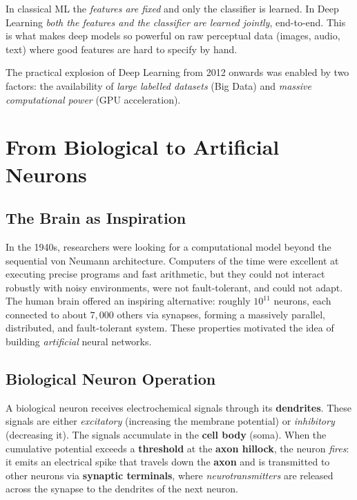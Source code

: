 \documentclass[11pt,a4paper]{article}
\newcommand{\term}[1]{\textcolor{DefGreen}{\textbf{#1}}}
\begin{document}
\begin{insightbox}
In classical ML the \emph{features are fixed} and only the classifier is learned. In Deep Learning \emph{both the features and the classifier are learned jointly}, end-to-end. This is what makes deep models so powerful on raw perceptual data (images, audio, text) where good features are hard to specify by hand.
\end{insightbox}

The practical explosion of Deep Learning from 2012 onwards was enabled by two factors: the availability of \emph{large labelled datasets} (Big Data) and \emph{massive computational power} (GPU acceleration).

\section{From Biological to Artificial Neurons}

\subsection{The Brain as Inspiration}

In the 1940s, researchers were looking for a computational model beyond the sequential von Neumann architecture. Computers of the time were excellent at executing precise programs and fast arithmetic, but they could not interact robustly with noisy environments, were not fault-tolerant, and could not adapt. The human brain offered an inspiring alternative: roughly $10^{11}$ neurons, each connected to about $7{,}000$ others via synapses, forming a massively parallel, distributed, and fault-tolerant system. These properties motivated the idea of building \emph{artificial} neural networks.

\subsection{Biological Neuron Operation}

A biological neuron receives electrochemical signals through its \term{dendrites}. These signals are either \emph{excitatory} (increasing the membrane potential) or \emph{inhibitory} (decreasing it). The signals accumulate in the \term{cell body} (soma). When the cumulative potential exceeds a \term{threshold} at the \term{axon hillock}, the neuron \emph{fires}: it emits an electrical spike that travels down the \term{axon} and is transmitted to other neurons via \term{synaptic terminals}, where \emph{neurotransmitters} are released across the synapse to the dendrites of the next neuron.
\end{document}
